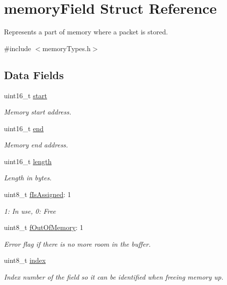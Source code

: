 \hypertarget{structmemory_field}{}\section{memory\+Field Struct Reference}
\label{structmemory_field}


Represents a part of memory where a packet is stored.  




{\ttfamily \#include $<$memory\+Types.\+h$>$}

\subsection*{Data Fields}
\begin{DoxyCompactItemize}
\item 
uint16\+\_\+t \mbox{\hyperlink{structmemory_field_a171a2b5d11b1a5891c38a98ac731a161}{start}}
\begin{DoxyCompactList}\small\item\em Memory start address. \end{DoxyCompactList}\item 
uint16\+\_\+t \mbox{\hyperlink{structmemory_field_afbcd798d035e37e733b567c2b0cb96dc}{end}}
\begin{DoxyCompactList}\small\item\em Memory end address. \end{DoxyCompactList}\item 
uint16\+\_\+t \mbox{\hyperlink{structmemory_field_a1892eba2086d12ac2b09005aeb09ea3b}{length}}
\begin{DoxyCompactList}\small\item\em Length in bytes. \end{DoxyCompactList}\item 
uint8\+\_\+t \mbox{\hyperlink{structmemory_field_a36ed4d8e7e2e5f308044e7b422a80028}{f\+Is\+Assigned}}\+: 1
\begin{DoxyCompactList}\small\item\em 1\+: In use, 0\+: Free \end{DoxyCompactList}\item 
uint8\+\_\+t \mbox{\hyperlink{structmemory_field_a90bc80d5fb22db8fba7b5601b9336395}{f\+Out\+Of\+Memory}}\+: 1
\begin{DoxyCompactList}\small\item\em Error flag if there is no more room in the buffer. \end{DoxyCompactList}\item 
uint8\+\_\+t \mbox{\hyperlink{structmemory_field_aae5a12e607d0f782506d9e6ec6179c64}{index}}
\begin{DoxyCompactList}\small\item\em Index number of the field so it can be identified when freeing memory up. \end{DoxyCompactList}\end{DoxyCompactItemize}


